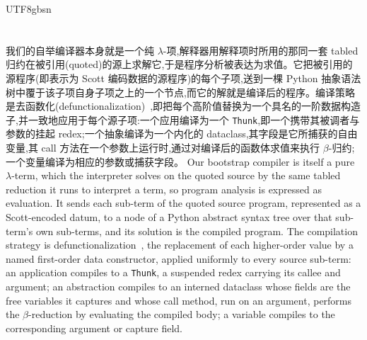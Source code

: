 \begin{CJK*}{UTF8}{gbsn}
  \section{}\label{app:compiler}
  \ifTablambdaChinese
  我们的自举编译器本身就是一个纯 $\lambda$-项,解释器用解释项时所用的那同一套 tabled 归约在被引用(quoted)的源上求解它,于是程序分析被表达为求值。它把被引用的源程序(即表示为 Scott 编码数据的源程序)的每个子项,送到一棵 Python 抽象语法树中覆于该子项自身子项之上的一个节点,而它的解就是编译后的程序。编译策略是去函数化(defunctionalization)~\cite{reynolds1972-definitional-interpreters-defunctionalization},即把每个高阶值替换为一个具名的一阶数据构造子,并一致地应用于每个源子项:一个应用编译为一个 \texttt{Thunk},即一个携带其被调者与参数的挂起 redex;一个抽象编译为一个内化的 dataclass,其字段是它所捕获的自由变量,其 call 方法在一个参数上运行时,通过对编译后的函数体求值来执行 $\beta$-归约;一个变量编译为相应的参数或捕获字段。
  \else
  Our bootstrap compiler is itself a pure $\lambda$-term, which the interpreter solves on the quoted source by the same tabled reduction it runs to interpret a term, so program analysis is expressed as evaluation. It sends each sub-term of the quoted source program, represented as a Scott-encoded datum, to a node of a Python abstract syntax tree over that sub-term's own sub-terms, and its solution is the compiled program. The compilation strategy is defunctionalization~\cite{reynolds1972-definitional-interpreters-defunctionalization}, the replacement of each higher-order value by a named first-order data constructor, applied uniformly to every source sub-term: an application compiles to a \texttt{Thunk}, a suspended redex carrying its callee and argument; an abstraction compiles to an interned dataclass whose fields are the free variables it captures and whose call method, run on an argument, performs the $\beta$-reduction by evaluating the compiled body; a variable compiles to the corresponding argument or capture field.
  \fi


\end{CJK*}
